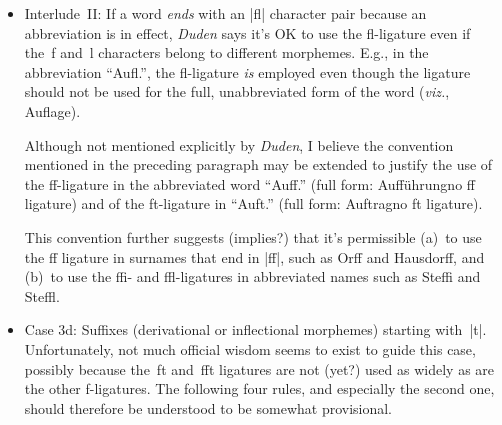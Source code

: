 \documentclass[11pt]{article}
\begin{document}
\begin{itemize}
\begin{itemize}
{It's fair to say, though, that most modern German speakers are only vaguely aware of the fact that the~|el| particle constitutes a morpheme in words such as Würfel and Griffel\textemdash and that they are probably entirely unaware of this fact for words such as Schwefel and Zweifel. To be sure, the typographical convention adduced by \emph{Duden} for suppressing the fl-ligature in words such as schweflig, Verzweiflung, and würfle does \emph{not} appear to be based on the fact that letters~|f| and~|l| in these words belong to different morphemes.}

This convention may also be applied to justify the non-use of the fl-ligature in words such as knifflig and mufflig as well as in the present-tense\slash first-person-singular forms of the verbs büffeln, löffeln, schaufeln, stiefeln, verteufeln, and zweifeln: these form are typeset \emph{without} the fl/ffl-ligature, i.e., as büffle, löffle, schaufle, stiefle, verteufle, and zweifle, respectively.

\item Interlude~II: If a word \emph{ends} with an |fl| character pair because an abbreviation is in effect, \emph{Duden} says it's OK to use the fl-ligature even if the~f and~l characters belong to different morphemes. E.g., in the abbreviation \enquote{Aufl.}, the fl-ligature \emph{is} employed even though the ligature should not be used for the full, unabbreviated form of the word (\emph{viz.}, Auflage).

Although not mentioned explicitly by \emph{Duden}, I believe the convention mentioned in the preceding paragraph may be extended to justify the use of the ff-ligature in the abbreviated word \enquote{Auff.} (full form: Aufführung\textemdash no ff ligature) and of the ft-ligature in \enquote{Auft.} (full form: Auftrag\textemdash no ft ligature).

This convention further suggests (implies?) that it's permissible (a)~to use the ff ligature in surnames that end in |ff|, such as Orff and Hausdorff, and (b)~to use the ffi- and ffl-ligatures in abbreviated names such as Steffi and Steffl. 

\item Case 3d: Suffixes (derivational or inflectional morphemes) starting with~|t|. Unfortunately, not much official wisdom seems to exist to guide this case, possibly because the~ft and~fft ligatures are not (yet?) used as widely as are the other f-ligatures. The following four rules, and especially the second one, should therefore be understood to be somewhat provisional.


\end{itemize}
\end{itemize}
\end{document}
